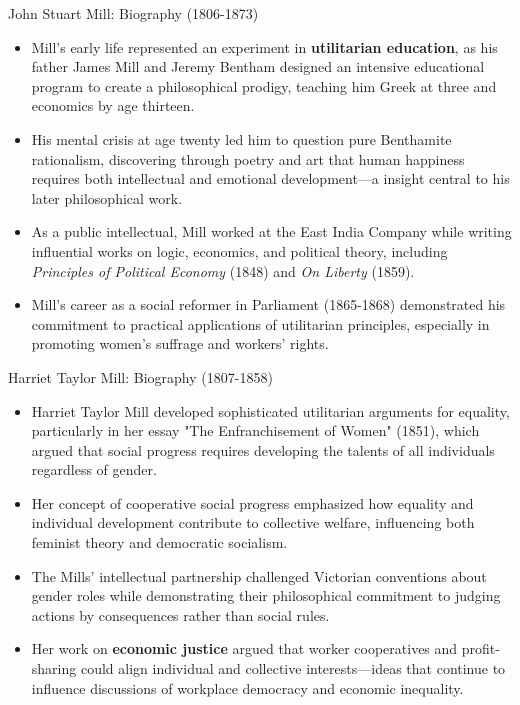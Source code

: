 \documentclass[aspectratio=169]{beamer}
\begin{document}
\begin{frame}{John Stuart Mill: Biography (1806-1873)}
    \begin{itemize}
        \item Mill's early life represented an experiment in \textbf{utilitarian education}, as his father James Mill and Jeremy Bentham designed an intensive educational program to create a philosophical prodigy, teaching him Greek at three and economics by age thirteen.
        
        \item His mental crisis at age twenty led him to question pure Benthamite rationalism, discovering through poetry and art that human happiness requires both intellectual and emotional development—a insight central to his later philosophical work.
        
        \item As a public intellectual, Mill worked at the East India Company while writing influential works on logic, economics, and political theory, including \textit{Principles of Political Economy} (1848) and \textit{On Liberty} (1859).
        
        \item Mill's career as a social reformer in Parliament (1865-1868) demonstrated his commitment to practical applications of utilitarian principles, especially in promoting women's suffrage and workers' rights.
    \end{itemize}
\end{frame}

\begin{frame}{Harriet Taylor Mill: Biography (1807-1858)}
    \begin{itemize}
        \item Harriet Taylor Mill developed sophisticated utilitarian arguments for equality, particularly in her essay "The Enfranchisement of Women" (1851), which argued that social progress requires developing the talents of all individuals regardless of gender.
        
        \item Her concept of cooperative social progress emphasized how equality and individual development contribute to collective welfare, influencing both feminist theory and democratic socialism.
        
        \item The Mills' intellectual partnership challenged Victorian conventions about gender roles while demonstrating their philosophical commitment to judging actions by consequences rather than social rules.
        
        \item Her work on \textbf{economic justice} argued that worker cooperatives and profit-sharing could align individual and collective interests—ideas that continue to influence discussions of workplace democracy and economic inequality.
    \end{itemize}
\end{frame}
\end{document}

